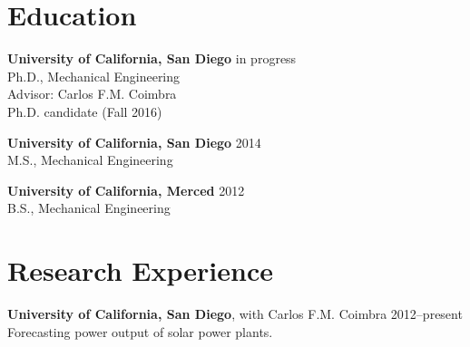 \documentclass[]{res}
\begin{document}
\address{University of California, San Diego \\ 9500 Gilman Drive \#0411 \\ La Jolla, CA 92093--0411}
\address{\hfill \href{mailto:dplarson@ucsd.edu}{dplarson@ucsd.edu} \\
    \hfill \url{http://ieng6.ucsd.edu/~dplarson} \\
    \hfill \url{http://github.com/dplarson}
}


\begin{resume}


\section{Education}
\vspace{0.1in}

\textbf{University of California, San Diego} \hfill in progress \\
Ph.D., Mechanical Engineering \\
Advisor: Carlos F.M. Coimbra \\
Ph.D. candidate (Fall 2016) \\

\vspace{-0.2in}

\textbf{University of California, San Diego} \hfill 2014 \\
M.S., Mechanical Engineering \\

\vspace{-0.2in}

\textbf{University of California, Merced} \hfill 2012 \\
B.S., Mechanical Engineering


\section{Research Experience}
\vspace{0.1in}

\textbf{University of California, San Diego}, with Carlos F.M. Coimbra \hfill 2012--present\\
Forecasting power output of solar power plants.


\end{resume}
\end{document}
